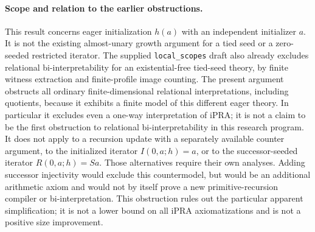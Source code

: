 \paragraph{Scope and relation to the earlier obstructions.}
This result concerns eager initialization $h(a)$ with an independent
initializer $a$.  It is not the existing almost-unary growth argument
for a tied seed or a zero-seeded restricted iterator.  The supplied
\texttt{local\_scopes} draft also already excludes relational
bi-interpretability for an existential-free tied-seed theory, by finite
witness extraction and finite-profile image counting.  The present
argument obstructs all ordinary finite-dimensional relational
interpretations, including quotients, because it exhibits a finite
model of this different eager theory.  In particular it excludes even
a one-way interpretation of iPRA; it is not a claim to be the first
obstruction to relational bi-interpretability in this research program.
It does not apply to a recursion
update with a separately available counter argument, to the initialized
iterator $I(0,a;h)=a$, or to the successor-seeded iterator
$R(0,a;h)=Sa$.  Those alternatives require their own analyses.
Adding successor injectivity would exclude this countermodel, but would
be an additional arithmetic axiom and would not by itself prove a new
primitive-recursion compiler or bi-interpretation.  This obstruction
rules out the particular apparent simplification; it is not a lower
bound on all iPRA axiomatizations and is not a positive size improvement.
